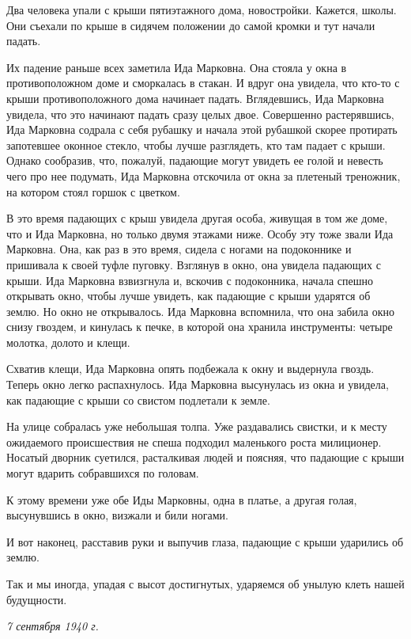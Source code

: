 Два человека упали с крыши пятиэтажного дома, новостройки. Кажется, школы. Они съехали по крыше в сидячем положении до самой кромки и тут начали падать.

Их падение раньше всех заметила Ида Марковна. Она стояла у окна в противоположном доме и сморкалась в стакан. И вдруг она увидела, что кто-то с крыши противоположного дома начинает падать. Вглядевшись, Ида Марковна увидела, что это начинают падать сразу целых двое. Совершенно растерявшись, Ида Марковна содрала с себя рубашку и начала этой рубашкой скорее протирать запотевшее оконное стекло, чтобы лучше разглядеть, кто там падает с крыши. Однако сообразив, что, пожалуй, падающие могут увидеть ее голой и невесть чего про нее подумать, Ида Марковна отскочила от окна за плетеный треножник, на котором стоял горшок с цветком.

В это время падающих с крыш увидела другая особа, живущая в том же доме, что и Ида Марковна, но только двумя этажами ниже. Особу эту тоже звали Ида Марковна. Она, как раз в это время, сидела с ногами на подоконнике и пришивала к своей туфле пуговку. Взглянув в окно, она увидела падающих с крыши. Ида Марковна взвизгнула и, вскочив с подоконника, начала спешно открывать окно, чтобы лучше увидеть, как падающие с крыши ударятся об землю. Но окно не открывалось. Ида Марковна вспомнила, что она забила окно снизу гвоздем, и кинулась к печке, в которой она хранила инструменты: четыре молотка, долото и клещи.

Схватив клещи, Ида Марковна опять подбежала к окну и выдернула гвоздь. Теперь окно легко распахнулось. Ида Марковна высунулась из окна и увидела, как падающие с крыши со свистом подлетали к земле.

На улице собралась уже небольшая толпа. Уже раздавались свистки, и к месту ожидаемого происшествия не спеша подходил маленького роста милиционер. Носатый дворник суетился, расталкивая людей и поясняя, что падающие с крыши могут вдарить собравшихся по головам.

К этому времени уже обе Иды Марковны, одна в платье, а другая голая, высунувшись в окно, визжали и били ногами.

И вот наконец, расставив руки и выпучив глаза, падающие с крыши ударились об землю.

Так и мы иногда, упадая с высот достигнутых, ударяемся об унылую клеть нашей будущности.

\medskip
\noindent\textit{7 сентября 1940 г.}